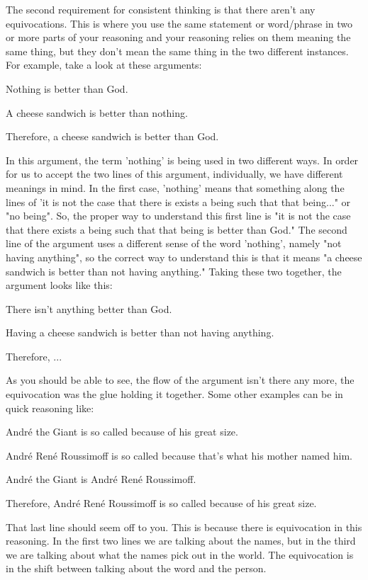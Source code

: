 The second requirement for consistent thinking is that there aren't any equivocations. This is where you use the same statement or word/phrase in two or more parts of your reasoning and your reasoning relies on them meaning the same thing, but they don't mean the same thing in the two different instances. For example, take a look at these arguments:
\begin{earg}
   \item[] Nothing is better than God.
    \item[]A cheese sandwich is better than nothing.
    \item[]Therefore, a cheese sandwich is better than God.
\end{earg}
In this argument, the term 'nothing' is being used in two different ways. In order for us to accept the two lines of this argument, individually, we have different meanings in mind. In the first case, 'nothing' means that something along the lines of 'it is not the case that there is exists a being such that that being..." or "no being". So, the proper way to understand this first line is "it is not the case that there exists a being such that that being is better than God." The second line of the argument uses a different sense of the word 'nothing', namely "not having anything", so the correct way to understand this is that it means "a cheese sandwich is better than not having anything." Taking these two together, the argument looks like this:
\begin{earg}
    \item[]There isn't anything better than God.
    \item[]Having a cheese sandwich is better than not having anything.
    \item[]Therefore, ...
\end{earg}
As you should be able to see, the flow of the argument isn't there any more, the equivocation was the glue holding it together. Some other examples can be in quick reasoning like:
\begin{earg}
    \item[]André the Giant is so called because of his great size.
    \item[]André René Roussimoff is so called because that's what his mother named him.
    \item[]André the Giant is André René Roussimoff.
    \item[]Therefore, André René Roussimoff is so called because of his great size.
\end{earg}
That last line should seem off to you. This is because there is equivocation in this reasoning. In the first two lines we are talking about the names, but in the third we are talking about what the names pick out in the world. The equivocation is in the shift between talking about the word and the person.

